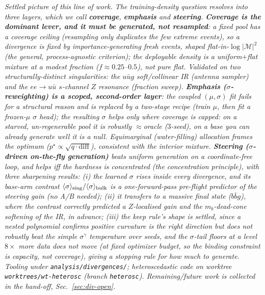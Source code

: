 \documentclass[11pt]{article}
\newcommand{\code}[1]{\texttt{#1}}
\begin{document}
\emph{Settled picture of this line of work. The training-density question resolves into three
layers, which we call \textbf{coverage}, \textbf{emphasis} and \textbf{steering}.
\textbf{Coverage is the dominant lever, and it must be \emph{generated}, not resampled}: a fixed pool
has a coverage ceiling (resampling only duplicates the few extreme events), so a divergence is fixed
by importance-\emph{generating} fresh events, shaped flat-in-$\log|\mathcal{M}|^2$ (the general,
process-agnostic criterion); the deployable density is a uniform$+$flat \emph{mixture} at a modest
fraction ($f\!\approx\!0.25$--$0.5$), not pure flat. Validated on two structurally-distinct
singularities: the $u\bar u g$ soft/collinear IR (antenna sampler) and the $ee\to u\bar u$
$s$-channel $Z$ resonance (fraction sweep). \textbf{Emphasis ($\sigma$-reweighting) is a scoped,
second-order layer}: the coupled $(\mu,\sigma)$ fit fails for a structural reason
and is replaced by a two-stage recipe (train $\mu$, then fit a frozen-$\mu$ $\sigma$ head); the
resulting $\sigma$ helps \emph{only where coverage is capped}: on a starved, un-regenerable pool it
is robustly ${\approx}$oracle ($3$-seed), on a base you can already generate well it is a null.
Equimarginal (water-filling) allocation frames the optimum ($p^\star\!\propto\!\sqrt{q\cdot
\mathrm{diff}}$), consistent with the interior mixture. \textbf{Steering ($\sigma$-driven
on-the-fly generation)} beats uniform generation on a coordinate-free loop, and helps \emph{iff} the hardness is
\emph{concentrated} (the concentration principle), with three sharpening results: (i) the learned
$\sigma$ rises inside every divergence, and its base-arm \emph{contrast}
$\langle\sigma\rangle_{\rm sing}/\langle\sigma\rangle_{\rm bulk}$ is a one-forward-pass \emph{pre-flight}
predictor of the steering gain (no A/B needed); (ii) it transfers to a \emph{massive} final state
($b\bar b g$), where the contrast correctly predicted a $Z$-localised gain and the $m_b$-dead-cone
softening of the IR, in advance; (iii) the keep rule's shape is settled, since a nested polynomial confirms
\emph{positive curvature} is the right direction but does not robustly beat the simple $\sigma^\gamma$
temperature over seeds, and the $\sigma$-tail \emph{floors} at a level $8\times$ more data does not move
(at fixed optimizer budget, so the binding constraint is capacity, not coverage), giving a stopping
rule for how much to generate. Tooling under \code{analysis/divergences/};
heteroscedastic code on worktree \code{worktrees/wt-heterosc} (branch \code{heterosc}). Remaining/future
work is collected in the hand-off, Sec.~\ref{sec:div-open}.}
\end{document}
